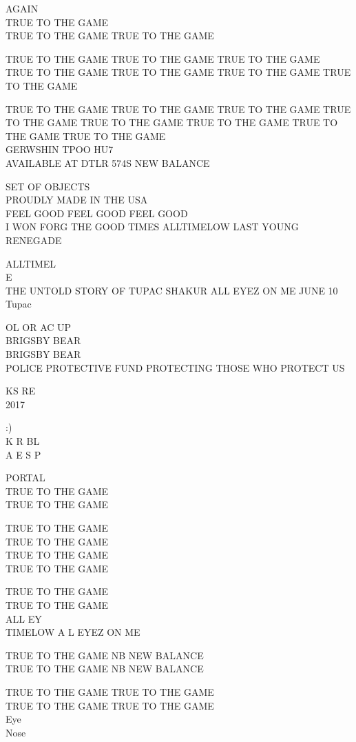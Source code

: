 \documentclass[10pt,letterpaper]{article}
\begin{document}
AGAIN\\
TRUE TO THE GAME\\
TRUE TO THE GAME TRUE TO THE GAME

TRUE TO THE GAME TRUE TO THE GAME TRUE TO THE GAME\\
TRUE TO THE GAME TRUE TO THE GAME TRUE TO THE GAME TRUE TO THE GAME

TRUE TO THE GAME TRUE TO THE GAME TRUE TO THE GAME TRUE TO THE GAME TRUE TO THE GAME TRUE TO THE GAME TRUE TO THE GAME TRUE TO THE GAME\\
GERWSHIN TPOO HU7\\
AVAILABLE AT DTLR 574S NEW BALANCE

SET OF OBJECTS\\
PROUDLY MADE IN THE USA\\
FEEL GOOD FEEL GOOD FEEL GOOD\\
I WON FORG THE GOOD TIMES ALLTIMELOW LAST YOUNG RENEGADE

ALLTIMEL\\
E\\
THE UNTOLD STORY OF TUPAC SHAKUR ALL EYEZ ON  ME JUNE 10\\
Tupac

OL OR AC UP\\
BRIGSBY BEAR\\
BRIGSBY BEAR\\
POLICE PROTECTIVE FUND PROTECTING THOSE WHO PROTECT US

KS RE\\
2017

:)\\
K R BL\\
A E S P

PORTAL\\
TRUE TO THE GAME\\
TRUE TO THE GAME

TRUE TO THE GAME\\
TRUE TO THE GAME\\
TRUE TO THE GAME\\
TRUE TO THE GAME

TRUE TO THE GAME\\
TRUE TO THE GAME\\
ALL EY\\
TIMELOW A L EYEZ ON ME

TRUE TO THE GAME NB NEW BALANCE\\
TRUE TO THE GAME NB NEW BALANCE

TRUE TO THE GAME TRUE TO THE GAME\\
TRUE TO THE GAME TRUE TO THE GAME\\
Eye\\
Nose
\end{document}
